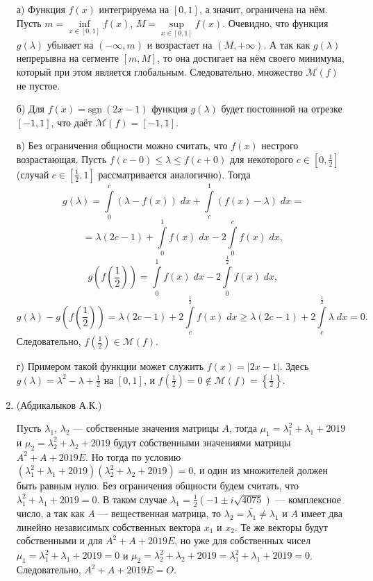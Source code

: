 \documentclass[11pt, a4paper]{article}
\begin{document}
\begin{enumerate}
а) Функция $f(x)$ интегрируема на $[0, 1]$, а значит, ограничена на нём. Пусть $m=\inf\limits_{x\in [0, 1]} f(x)$, $M=\sup\limits_{x\in [0, 1]} f(x)$. Очевидно, что функция $g(\lambda)$ убывает на $(-\infty, m)$ и возрастает на $(M, +\infty)$. А так как $g(\lambda)$ непрерывна на сегменте $[m, M]$, то она достигает на нём своего минимума, который при этом является глобальным. Следовательно, множество $\mathcal{M}(f)$ не пустое.

б) Для $f(x)={\mathrm{sgn}}~\left(2x-1\right)$ функция $g(\lambda)$ будет постоянной на отрезке $[-1, 1]$, что даёт $\mathcal{M}(f)=[-1, 1]$.

в) Без ограничения общности можно считать, что $f(x)$ нестрого возрастающая. Пусть $f(c-0)\leqslant \lambda \leqslant f(c+0)$ для некоторого $c\in\left[0, \frac{1}{2}\right]$ (случай $c\in\left[\frac{1}{2}, 1\right]$ рассматривается аналогично). Тогда
$$
g(\lambda) = \int\limits_{0}^{c} (\lambda - f(x)) \; dx + \int\limits_{c}^{1} (f(x) - \lambda) \; dx = 
$$
$$
=\lambda(2c-1)+ \int\limits_{0}^{1}{f(x) \; dx}-2\int\limits_{0}^{c}{f(x) \; dx},
$$
$$
g\left(f\left(\frac{1}{2}\right)\right)=\int\limits_{0}^{1}{f(x) \; dx}-2\int\limits_{0}^{\frac{1}{2}}{f(x) \; dx},
$$
$$
g(\lambda)-g\left(f\left(\frac{1}{2}\right)\right) = \lambda(2c-1) + 2\int\limits_{c}^{\frac{1}{2}}{f(x) \; dx} \geqslant \lambda(2c-1) + 2\int\limits_{c}^{\frac{1}{2}}{\lambda \; dx}= 0.
$$
Следовательно, $f\left(\frac{1}{2}\right)\in \mathcal{M}(f)$.

г) Примером такой функции может служить $f(x)=|2x-1|$. Здесь $g(\lambda)=\lambda^2-\lambda+\frac{1}{2}$ на $[0, 1]$, и $f\left(\frac{1}{2}\right)=0\not\in\mathcal{M}(f)=\left\{\frac{1}{2}\right\}$.

\newpage

\item (Абдикалыков А.К.) 

Пусть $\lambda_1$, $\lambda_2$ --- собственные значения матрицы $A$, тогда $\mu_1=\lambda_1^2+\lambda_1+2019$ и $\mu_2=\lambda_2^2+\lambda_2+2019$ будут собственными значениями матрицы $A^2+A+2019E$. Но тогда по условию $(\lambda_1^2+\lambda_1+2019)(\lambda_2^2+\lambda_2+2019)=0$, и один из множителей должен быть равным нулю. Без ограничения общности будем считать, что $\lambda_1^2+\lambda_1+2019=0$. В таком случае $\lambda_1=\frac{1}{2}\left(-1\pm i\sqrt{4075}\right)$ --- комплексное число, а так как $A$ --- вещественная матрица, то $\lambda_2=\overline{\lambda_1}\not=\lambda_1$ и $A$ имеет два линейно независимых собственных вектора $x_1$ и $x_2$. Те же векторы будут собственными и для $A^2+A+2019E$, но уже для собственных чисел $\mu_1=\lambda_1^2+\lambda_1+2019=0$ и $\mu_2=\lambda_2^2+\lambda_2+2019=\overline{\lambda_1^2+\lambda_1+2019}=0$. Следовательно, $A^2 + A + 2019 E = O$.


\end{enumerate}
\end{document}
